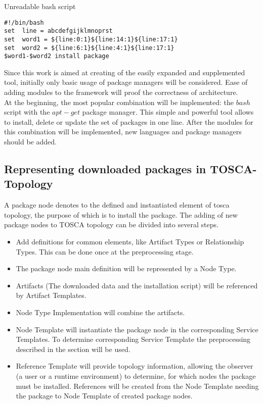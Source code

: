 \begin{Listing} 
	\caption{Unreadable bash script}
	\label{alg:unreadable}
\begin{lstlisting}
#!/bin/bash
set  line = abcdefgijklmnoprst
set  word1 = ${line:0:1}${line:14:1}${line:17:1} 
set  word2 = ${line:6:1}${line:4:1}${line:17:1}
$word1-$word2 install package
\end{lstlisting}
\end{Listing}
Since this work is aimed at creating of the easily expanded and supplemented tool, initially only basic usage of package managers will be considered.
Ease of adding modules to the framework will proof the correctness of architecture.\\
At the beginning, the most popular combination will be implemented: the $bash$ script with the $apt-get$ package manager.
This simple and powerful tool allows to install, delete or update the set of packages in one line.
After the modules for this combination will be implemented, new languages and package managers should be added.
\subsection{Representing downloaded packages in TOSCA-Topology} \label{subs:repres}
A package node denotes to the defined and instantiated element of \gls{tosca} topology, the purpose of which is to install the package.
The adding of new package nodes to TOSCA topology can be divided into several steps.
\begin{itemize}
	\item Add definitions for common elements, like Artifact Types or Relationship Types. 
		This can be done once at the preprocessing stage.
	\item The package node main definition will be represented by a Node Type. 
	\item Artifacts (The downloaded data and the installation script) will be referenced by Artifact Templates.
	\item Node Type Implementation will combine the artifacts.
	\item Node Template will instantiate the package node in the corresponding Service Templates.
		To determine corresponding Service Template the preprocessing described in the section  will be used.
	\item Reference Template will provide topology information, allowing the observer (a user or a runtime environment) to determine, for which nodes the package must be installed.
		References will be created from the Node Template needing the package to Node Template of created package nodes.
\end{itemize}
